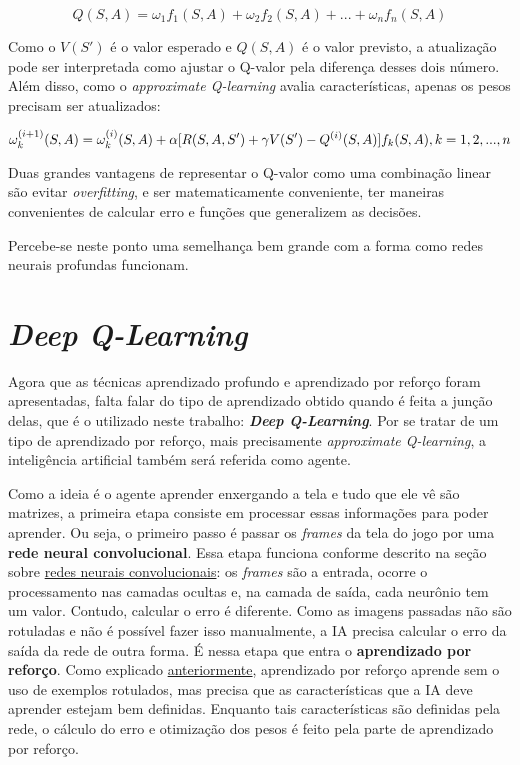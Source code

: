 \begin{equation} \label{eq:q_lin_comb}
Q(S,A) = \omega_{1}f_{1}(S,A) + \omega_{2}f_{2}(S,A) + ... + \omega_{n}f_{n}(S,A)
\end{equation}

Como o $V(S')$ é o valor esperado e $Q(S,A)$ é o valor previsto, a atualização pode ser interpretada como ajustar o Q-valor pela diferença desses dois número. Além disso, como o \textit{approximate Q-learning} avalia características, apenas os pesos precisam ser atualizados:

\begin{equation} \label{eq:w_update}
\omega_{k}^{(i+1)}(S,A) = \omega_{k}^{(i)}(S,A) + \alpha[R(S,A,S') + \gamma V(S') - Q^{(i)}(S,A)]f_{k}(S,A), \hfill k = 1, 2, ..., n
\end{equation}

Duas grandes vantagens de representar o Q-valor como uma combinação linear são evitar \textit{overfitting}, e ser matematicamente conveniente, ter maneiras convenientes de calcular erro e funções que generalizem as decisões.

Percebe-se neste ponto uma semelhança bem grande com a forma como redes neurais profundas funcionam.


\section{\textit{Deep Q-Learning}}
\label{sec:dql}

Agora que as técnicas aprendizado profundo e aprendizado por reforço foram apresentadas, falta falar do tipo de aprendizado obtido quando é feita a junção delas, que é o utilizado neste trabalho: \textit{\textbf{Deep Q-Learning}}.
Por se tratar de um tipo de aprendizado por reforço, mais precisamente \textit{approximate Q-learning}, a inteligência artificial também será referida como agente.

Como a ideia é o agente aprender enxergando a tela e tudo que ele vê são matrizes, a primeira etapa consiste em processar essas informações para poder aprender.
Ou seja, o primeiro passo é passar os \textit{frames} da tela do jogo por uma \textbf{rede neural convolucional}.
Essa etapa funciona conforme descrito na seção sobre \hyperref[sec:cnn]{redes neurais convolucionais}: os \textit{frames} são a entrada, ocorre o processamento nas camadas ocultas e, na camada de saída, cada neurônio tem um valor.
Contudo, calcular o erro é diferente.
Como as imagens passadas não são rotuladas e não é possível fazer isso manualmente, a IA precisa calcular o erro da saída da rede de outra forma.
É nessa etapa que entra o \textbf{aprendizado por reforço}.
Como explicado \hyperref[sec:rl]{anteriormente}, aprendizado por reforço aprende sem o uso de exemplos rotulados, mas precisa que as características que a IA deve aprender estejam bem definidas.
Enquanto tais características são definidas pela rede, o cálculo do erro e otimização dos pesos é feito pela parte de aprendizado por reforço.

